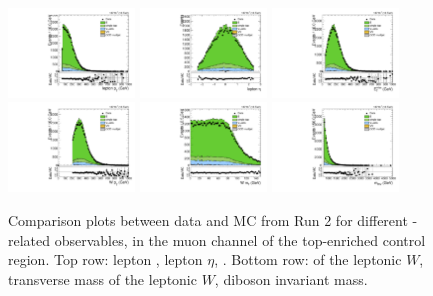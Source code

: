 \begin{figure}[htbp]
  \centering
  \includegraphics[width=0.3\textwidth]{fig/controlPlots/CR_b1_mu_allP_allC_allD_Run2_lnujj_l1_l_pt.pdf}
  \includegraphics[width=0.3\textwidth]{fig/controlPlots/CR_b1_mu_allP_allC_allD_Run2_lnujj_l1_l_eta.pdf}
  \includegraphics[width=0.3\textwidth]{fig/controlPlots/CR_b1_mu_allP_allC_allD_Run2_met_pt.pdf}\\
  \includegraphics[width=0.3\textwidth]{fig/controlPlots/CR_b1_mu_allP_allC_allD_Run2_lnujj_l1_pt.pdf}
  \includegraphics[width=0.3\textwidth]{fig/controlPlots/CR_b1_mu_allP_allC_allD_Run2_lnujj_l1_mt.pdf}
  \includegraphics[width=0.3\textwidth]{fig/controlPlots/CR_b1_mu_allP_allC_allD_Run2_mWV.pdf}\\
  \caption{
    Comparison plots between data and MC from Run 2 for different \Wlep-related observables, in the muon channel of the top-enriched control region.
    Top row: lepton \pt, lepton $\eta$, \ptmiss.
    Bottom row: \pt of the leptonic $W$, transverse mass of the leptonic $W$, diboson invariant mass.
  }
  \label{fig:CR_controlPlotsRun2_1}
\end{figure}

